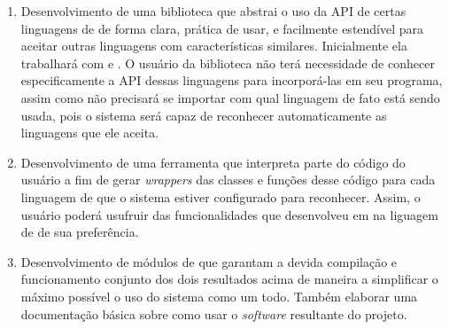 \begin{enumerate}
  \item Desenvolvimento de uma biblioteca \CXX{} que abstrai o uso da API de
        certas linguagens de \script{} de forma clara, prática de usar, e
        facilmente estendível para aceitar outras linguagens com características
        similares. Inicialmente ela trabalhará com  e . O
        usuário da biblioteca não terá necessidade de conhecer especificamente a
        API dessas linguagens para incorporá-las em seu programa, assim como não
        precisará se importar com qual linguagem de fato está sendo usada, pois
        o sistema será capaz de reconhecer automaticamente as linguagens que ele
        aceita.
  \item Desenvolvimento de uma ferramenta que interpreta parte do código \CXX{}
        do usuário a fim de gerar \emph{wrappers}\footnotemark{} das classes e
        funções desse código para cada linguagem de \script{} que o sistema
        estiver configurado para reconhecer. Assim, o usuário poderá usufruir
        das funcionalidades que desenvolveu em \CXX{} na liguagem de \script{}
        de sua preferência.
  \item Desenvolvimento de módulos de  que garantam a devida
        compilação e funcionamento conjunto dos dois resultados acima de maneira
        a simplificar o máximo possível o uso do sistema como um todo. Também
        elaborar uma documentação básica sobre como usar o \emph{software}
        resultante do projeto.

\end{enumerate}

